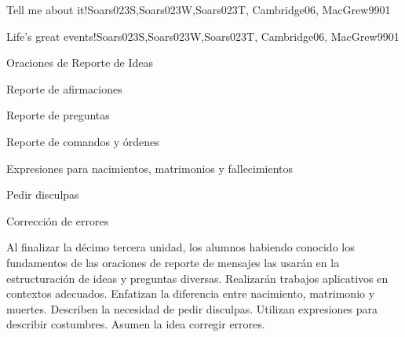 \begin{syllabus}
\begin{unit}{Tell me about it!}{Soars023S,Soars023W,Soars023T, Cambridge06, MacGrew99}{0}{1}
\end{unit}

\begin{unit}{Life's great events!}{Soars023S,Soars023W,Soars023T, Cambridge06, MacGrew99}{0}{1}
   \begin{topics}
      \item Oraciones de Reporte de Ideas
      \item Reporte de afirmaciones
      \item Reporte de preguntas
      \item Reporte de comandos y órdenes
      \item Expresiones para nacimientos, matrimonios y fallecimientos
      \item Pedir disculpas
      \item Corrección de errores
   \end{topics}

   \begin{unitgoals}
      \item Al finalizar la décimo tercera unidad, los alumnos habiendo conocido los fundamentos de las oraciones de reporte de mensajes las usarán en la estructuración de ideas y preguntas diversas. Realizarán trabajos aplicativos en contextos adecuados. Enfatizan la diferencia entre nacimiento, matrimonio y muertes. Describen la necesidad de pedir disculpas. Utilizan expresiones para describir costumbres. Asumen la idea corregir errores.
   \end{unitgoals}
\end{unit}

\begin{coursebibliography}
\end{coursebibliography}
\end{syllabus}
%

